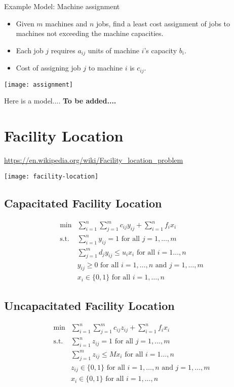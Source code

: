 \documentclass[../open-optimization/open-optimization.tex]{subfiles}
\begin{document}
Example Model: Machine assignment\\

\begin{minipage}{0.6\textwidth}
\begin{itemize}
	\item Given $m$ machines and $n$ jobs, find a least cost assignment
	of jobs to machines not exceeding the machine capacities.
	\item Each job $j$ requires $a_{ij}$ units of machine $i$'s capacity $b_i$.
	\item Cost of assigning job $j$ to machine $i$ is $c_{ij}$.
	\end{itemize}
\end{minipage}
\begin{minipage}{0.3\textwidth}
\texttt{[image: assignment]}
\end{minipage}


Here is a model....  \textbf{To be added....}

\section{Facility Location}
\url{https://en.wikipedia.org/wiki/Facility_location_problem}

\texttt{[image: facility-location]}

\subsection{Capacitated Facility Location}
\begin{equation}
\begin{array}{rl}
\min & \displaystyle\sum_{i=1}^n\sum_{j=1}^mc_{ij}y_{ij}+\sum_{i=1}^nf_ix_i \\
\text{s.t.} & \displaystyle\sum_{i=1}^ny_{ij}=1 \text{ for all }j=1,\dots,m \\
& \displaystyle \sum_{j=1}^md_jy_{ij}\leqslant u_ix_i\text{ for all }i=1\dots,n \\
&y_{ij}\geqslant0\text{ for all }i=1,\dots,n \text{ and }j=1,\dots,m\\
&x_i\in\{0,1\}\text{ for all } i=1,\dots,n
\end{array}
\end{equation}

\subsection{Uncapacitated Facility Location}
\begin{equation}
\begin{array}{rl}
\min & \displaystyle\sum_{i=1}^n\sum_{j=1}^mc_{ij}z_{ij}+\sum_{i=1}^nf_ix_i \\
\text{s.t.} & \displaystyle\sum_{i=1}^nz_{ij}=1 \text{ for all }j=1,\dots,m \\
& \displaystyle \sum_{j=1}^mz_{ij}\leqslant Mx_i\text{ for all }i=1\dots,n \\
&z_{ij}\in\{0,1\}\text{ for all }i=1,\dots,n \text{ and }j=1,\dots,m\\
&x_i\in\{0,1\}\text{ for all } i=1,\dots,n
\end{array}
\end{equation}
\end{document}
